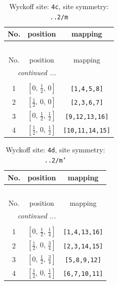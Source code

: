 \documentclass[fleqn,8pt]{jsarticle}
\begin{document}
\renewcommand{\arraystretch}{1.2}
\begin{longtable}{ccc}
\caption{Wyckoff site: {\tt 4c}, site symmetry: {\tt ..2/m}}
 \\
 \hline \hline
No. & position & mapping \\ \hline \endfirsthead

\multicolumn{2}{l}{\tablename\ \thetable{}} \\
 \hline \hline
No. & position & mapping \\ \hline \endhead

 \hline \hline
\multicolumn{2}{r}{\footnotesize\it continued ...} \\ \endfoot

 \hline \hline
\multicolumn{2}{r}{} \\ \endlastfoot

1 & $\left[ 0,\, \frac{1}{2},\, 0 \right]$ & {\tt [1,4,5,8]} \\ \hline
2 & $\left[ \frac{1}{2},\, 0,\, 0 \right]$ & {\tt [2,3,6,7]} \\ \hline
3 & $\left[ 0,\, \frac{1}{2},\, \frac{1}{2} \right]$ & {\tt [9,12,13,16]} \\ \hline
4 & $\left[ \frac{1}{2},\, 0,\, \frac{1}{2} \right]$ & {\tt [10,11,14,15]} \\
\end{longtable}
\renewcommand{\arraystretch}{1.2}
\begin{longtable}{ccc}
\caption{Wyckoff site: {\tt 4d}, site symmetry: {\tt ..2/m'}}
 \\
 \hline \hline
No. & position & mapping \\ \hline \endfirsthead

\multicolumn{2}{l}{\tablename\ \thetable{}} \\
 \hline \hline
No. & position & mapping \\ \hline \endhead

 \hline \hline
\multicolumn{2}{r}{\footnotesize\it continued ...} \\ \endfoot

 \hline \hline
\multicolumn{2}{r}{} \\ \endlastfoot

1 & $\left[ 0,\, \frac{1}{2},\, \frac{1}{4} \right]$ & {\tt [1,4,13,16]} \\ \hline
2 & $\left[ \frac{1}{2},\, 0,\, \frac{3}{4} \right]$ & {\tt [2,3,14,15]} \\ \hline
3 & $\left[ 0,\, \frac{1}{2},\, \frac{3}{4} \right]$ & {\tt [5,8,9,12]} \\ \hline
4 & $\left[ \frac{1}{2},\, 0,\, \frac{1}{4} \right]$ & {\tt [6,7,10,11]} \\
\end{longtable}
\end{document}
